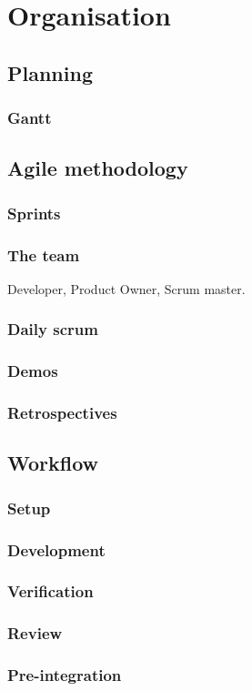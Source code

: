 \chapter{Organisation}

\section{Planning}
\subsection{Gantt}
%

\section{Agile methodology}
\subsection{Sprints}
\subsection{The team}
Developer, Product Owner, Scrum master.
\subsection{Daily scrum}
\subsection{Demos}
\subsection{Retrospectives}

\section{Workflow}
\subsection{Setup}
\subsection{Development}
\subsection{Verification}
\subsection{Review}
\subsection{Pre-integration}
